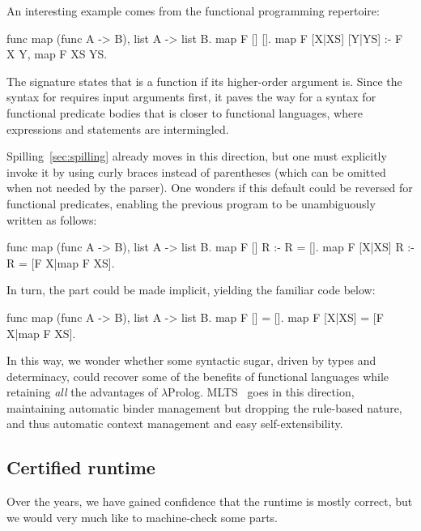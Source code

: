 \documentclass[a4paper, 11pt]{book}
\begin{document}
An interesting example comes from the functional programming repertoire:
\begin{elpicode}
func map (func A -> B), list A -> list B.
map F [] [].
map F [X|XS] [Y|YS] :- F X Y, map F XS YS.
\end{elpicode}

\noindent The signature states that  is a function if its
higher-order argument  is. Since the syntax for  requires
input arguments first, it paves the way for a syntax for functional predicate
bodies that is closer to functional languages, where expressions and statements
are intermingled.

Spilling~\cref{sec:spilling} already moves in this direction, but one must
explicitly invoke it by using curly braces instead of parentheses (which can be
omitted when not needed by the parser). One wonders if this default could be
reversed for functional predicates, enabling the previous program to be
unambiguously written as follows:

\begin{elpicode}
func map (func A -> B), list A -> list B.
map F [] R :- R = [].
map F [X|XS] R :- R = [F X|map F XS].
\end{elpicode}

\noindent
In turn, the  part could be made implicit, yielding the familiar
code below:

\begin{elpicode}
func map (func A -> B), list A -> list B.
map F [] = [].
map F [X|XS] = [F X|map F XS].
\end{elpicode}

\noindent In this way, we
wonder whether some syntactic sugar, driven by types and determinacy, could
recover some of the benefits of functional languages while retaining \emph{all}
the advantages of $\lambda$Prolog. MLTS~\cite{mlts} goes in this direction,
maintaining automatic binder management but dropping the rule-based nature, and
thus automatic context management and easy self-extensibility.

\subsection{Certified runtime}

Over the years, we have gained confidence that the runtime is mostly correct,
but we would very much like to machine-check some parts.
\end{document}
